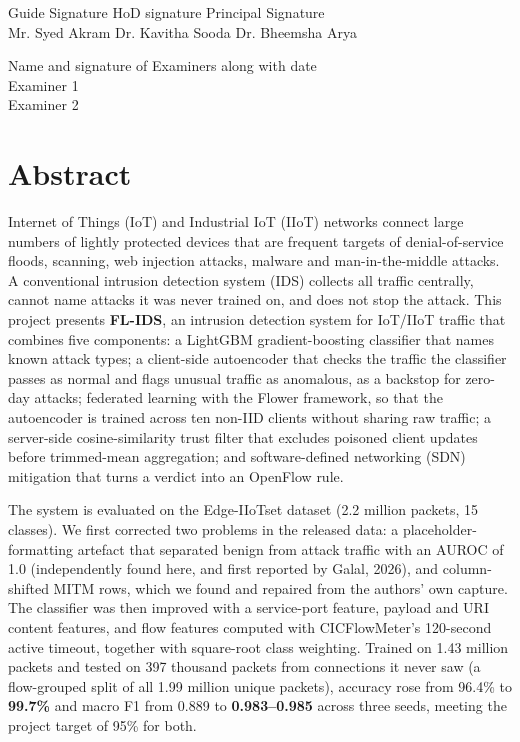 \documentclass[12pt,a4paper]{report}
\begin{document}
\vspace{2cm}
\begin{flushleft}
Guide Signature\hspace{30mm} HoD signature \hspace{25mm} Principal Signature\\
Mr. Syed Akram \hspace{29mm} Dr. Kavitha Sooda \hspace{19mm} Dr. Bheemsha Arya
\end{flushleft}
\vspace{2cm}
\begin{flushleft}
Name and signature of Examiners along with date \\
\vspace {1cm}
Examiner 1 \\
\vspace {1cm}
Examiner 2 \\

\end{flushleft}



\chapter*{Abstract}
\thispagestyle{empty}
Internet of Things (IoT) and Industrial IoT (IIoT) networks connect large numbers of lightly protected devices that are frequent targets of denial-of-service floods, scanning, web injection attacks, malware and man-in-the-middle attacks. A conventional intrusion detection system (IDS) collects all traffic centrally, cannot name attacks it was never trained on, and does not stop the attack. This project presents \textbf{FL-IDS}, an intrusion detection system for IoT/IIoT traffic that combines five components: a LightGBM gradient-boosting classifier that names known attack types; a client-side autoencoder that checks the traffic the classifier passes as normal and flags unusual traffic as anomalous, as a backstop for zero-day attacks; federated learning with the Flower framework, so that the autoencoder is trained across ten non-IID clients without sharing raw traffic; a server-side cosine-similarity trust filter that excludes poisoned client updates before trimmed-mean aggregation; and software-defined networking (SDN) mitigation that turns a verdict into an OpenFlow rule.

The system is evaluated on the Edge-IIoTset dataset (2.2 million packets, 15 classes). We first corrected two problems in the released data: a placeholder-formatting artefact that separated benign from attack traffic with an AUROC of 1.0 (independently found here, and first reported by Galal, 2026), and column-shifted MITM rows, which we found and repaired from the authors' own capture. The classifier was then improved with a service-port feature, payload and URI content features, and flow features computed with CICFlowMeter's 120-second active timeout, together with square-root class weighting. Trained on 1.43 million packets and tested on 397 thousand packets from connections it never saw (a flow-grouped split of all 1.99 million unique packets), accuracy rose from 96.4\% to \textbf{99.7\%} and macro F1 from 0.889 to \textbf{0.983--0.985} across three seeds, meeting the project target of 95\% for both.
\end{document}
